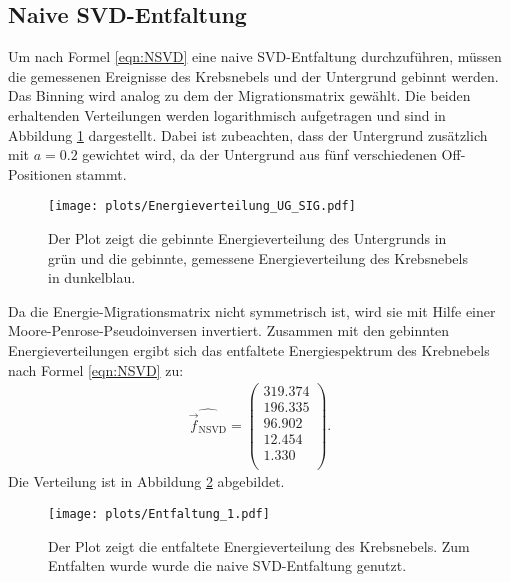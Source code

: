 \subsection{Naive SVD-Entfaltung}
Um nach Formel \eqref{eqn:NSVD} eine naive SVD-Entfaltung durchzuführen, müssen die gemessenen Ereignisse des Krebsnebels und der Untergrund gebinnt werden. Das Binning wird analog zu dem der Migrationsmatrix gewählt. Die beiden erhaltenden Verteilungen werden logarithmisch aufgetragen und sind in Abbildung \ref{fig:UG_Sig} dargestellt. Dabei ist zubeachten, dass der Untergrund zusätzlich mit $a=0.2$ gewichtet wird, da der Untergrund aus fünf verschiedenen Off-Positionen stammt.\\
\begin{figure}
  \centering
  \texttt{[image: plots/Energieverteilung\_UG\_SIG.pdf]}
  \caption{Der Plot zeigt die gebinnte Energieverteilung des Untergrunds in grün und die gebinnte, gemessene Energieverteilung des Krebsnebels in dunkelblau.}
  \label{fig:UG_Sig}
\end{figure}
Da die Energie-Migrationsmatrix nicht symmetrisch ist, wird sie mit Hilfe einer Moore-Penrose-Pseudoinversen invertiert. Zusammen mit den gebinnten Energieverteilungen ergibt sich das entfaltete Energiespektrum des Krebnebels nach Formel \eqref{eqn:NSVD} zu:
\begin{align*}
	\hat{\vec{f}_{\text{NSVD}}} = \begin{pmatrix}
			319.374\\
			196.335\\
			96.902\\
			12.454\\
			1.330\\
	\end{pmatrix}.
\end{align*}
Die Verteilung ist in Abbildung \ref{fig:E1} abgebildet.
\begin{figure}
  \centering
  \texttt{[image: plots/Entfaltung\_1.pdf]}
  \caption{Der Plot zeigt die entfaltete Energieverteilung des Krebsnebels. Zum Entfalten wurde wurde die naive SVD-Entfaltung genutzt.}
  \label{fig:E1}
\end{figure}
